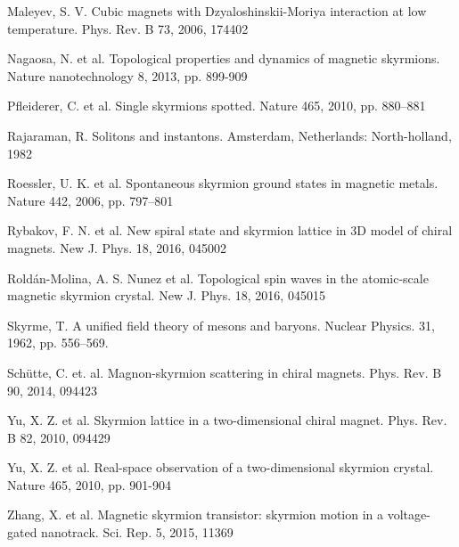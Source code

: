 \documentclass[a4paper,article,14pt]{extarticle}
\begin{document}
\begin{thebibliography}{1}
 Maleyev, S. V. \flqq Cubic magnets with Dzyaloshinskii-Moriya interaction at low temperature\frqq. Phys. Rev. B  73, 2006, 174402

 Nagaosa, N. et al. \flqq Topological properties and dynamics of magnetic skyrmions\frqq. Nature nanotechnology 8, 2013, pp. 899-909

 Pfleiderer, C. et al. \flqq Single skyrmions spotted\frqq. Nature 465, 2010, pp. 880–881

 Rajaraman, R. \flqq Solitons and instantons\frqq. Amsterdam, Netherlands: North-holland, 1982

 Roessler, U. K. et al. \flqq Spontaneous skyrmion ground
states in magnetic metals\frqq. Nature 442, 2006, pp. 797–801

 Rybakov, F. N. et al. \flqq New spiral state and skyrmion lattice in 3D model of chiral magnets\frqq. New J. Phys. 18, 2016, 045002

 Roldán-Molina, A. S. Nunez et al. \flqq Topological spin waves in the atomic-scale magnetic skyrmion crystal\frqq. New J. Phys. 18, 2016, 045015

 Skyrme, T. \flqq A unified field theory of mesons and baryons\frqq. Nuclear Physics. 31, 1962, pp. 556–569.

 Sch{\"u}tte, C. et. al. \flqq Magnon-skyrmion scattering in chiral magnets\frqq. Phys. Rev. B 90, 2014, 094423 

 Yu, X. Z. et al. \flqq Skyrmion lattice in a two-dimensional chiral magnet\frqq. Phys. Rev. B 82, 2010, 094429

 Yu, X. Z. et al. \flqq Real-space observation of a two-dimensional skyrmion crystal\frqq. Nature 465, 2010, pp. 901-904

 Zhang, X. et al. \flqq Magnetic skyrmion transistor: skyrmion motion in a voltage-gated nanotrack\frqq. Sci. Rep. 5, 2015, 11369

\end{thebibliography}
\end{document}
